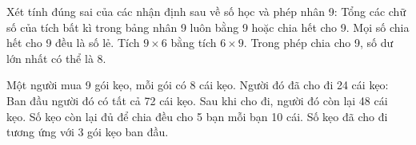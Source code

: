 \begin{ex} %
Xét tính đúng sai của các nhận định sau về số học và phép nhân 9:
\choiceTF
{\True Tổng các chữ số của tích bất kì trong bảng nhân 9 luôn bằng 9 hoặc chia hết cho 9.}
{Mọi số chia hết cho 9 đều là số lẻ.}
{\True Tích $9 \times 6$ bằng tích $6 \times 9$.}
{\True Trong phép chia cho 9, số dư lớn nhất có thể là 8.}
\end{ex}

\begin{ex} %
Một người mua 9 gói kẹo, mỗi gói có 8 cái kẹo. Người đó đã cho đi 24 cái kẹo:
\choiceTF
{\True Ban đầu người đó có tất cả 72 cái kẹo.}
{\True Sau khi cho đi, người đó còn lại 48 cái kẹo.}
{Số kẹo còn lại đủ để chia đều cho 5 bạn mỗi bạn 10 cái.}
{\True Số kẹo đã cho đi tương ứng với 3 gói kẹo ban đầu.}
\end{ex}

